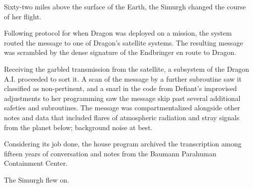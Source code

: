 Sixty-two miles above the surface of the Earth, the Simurgh changed the course of her flight.



Following protocol for when Dragon was deployed on a mission, the system routed the message to one of Dragon's satellite systems.  The resulting message was scrambled by the dense signature of the Endbringer en route to Dragon.



Receiving the garbled transmission from the satellite, a subsystem of the Dragon A.I. proceeded to sort it.  A scan of the message by a further subroutine saw it classified as non-pertinent, and a snarl in the code from Defiant's improvised adjustments to her programming saw the message skip past several additional safeties and subroutines.  The message was compartmentalized alongside other notes and data that included flares of atmospheric radiation and stray signals from the planet below; background noise at best.



Considering its job done, the house program archived the transcription among fifteen years of conversation and notes from the Baumann Parahuman Containment Center.



The Simurgh flew on.





